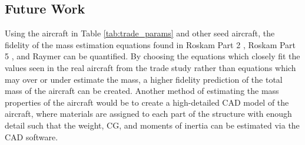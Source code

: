 \subsection{Future Work}
Using the aircraft in Table \ref{tab:trade_params} and other seed aircraft, the fidelity of the mass estimation equations found in Roskam Part 2 \cite{roskam_2}, Roskam Part 5 \cite{roskam_5}, and Raymer \cite{raymer} can be quantified. By choosing the equations which closely fit the values seen in the real aircraft from the trade study rather than equations which may over or under estimate the mass, a higher fidelity prediction of the total mass of the aircraft can be created. Another method of estimating the mass properties of the aircraft would be to create a high-detailed CAD model of the aircraft, where materials are assigned to each part of the structure with enough detail such that the weight, CG, and moments of inertia can be estimated via the CAD software. 







